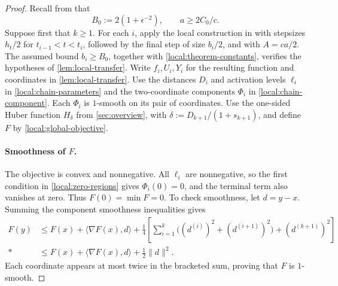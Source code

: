 \documentclass[11pt,letterpaper]{article}
\theoremstyle{definition}
\begin{document}
\begin{proof}
\label{local:chain-proof}
Recall from  that
\begin{equation}
  B_0:=2(1+\epsilon^{-2}),\qquad
  a\ge 2C_0/c.
  \label{local:theorem-constants}
\end{equation}
Suppose first that $k\ge1$.
For each $i$, apply the local construction in  with stepsizes $h_t/2$ for $t_{i-1}<t<t_i$, followed by the final step of size $b_i/2$, and with $A=ca/2$.
The assumed bound $b_i\ge B_0$, together with \eqref{local:theorem-constants}, verifies the hypotheses of \cref{lem:local-transfer}.
Write $f_i,U_i,Y_i$ for the resulting function and coordinates in \cref{lem:local-transfer}.
Use the distances $D_i$ and activation levels $\ell_i$ in \eqref{local:chain-parameters} and the two-coordinate components $\Phi_i$ in \eqref{local:chain-component}.
Each $\Phi_i$ is $1$-smooth on its pair of coordinates.
Use the one-sided Huber function $H_\delta$ from \cref{sec:overview}, with $\delta:=D_{k+1}/(1+s_{k+1})$, and define $F$ by \eqref{local:global-objective}.

\paragraph{Smoothness of $F$.}
The objective is convex and nonnegative.
All $\ell_i$ are nonnegative, so the first condition in \eqref{local:zero-regions} gives $\Phi_i(0)=0$, and the terminal term also vanishes at zero.
Thus $F(0)=\min F=0$.
To check smoothness, let $d=y-x$.
Summing the component smoothness inequalities gives
\begin{align*}
  F(y)&\le F(x)+\langle\nabla F(x),d\rangle
    +\frac14\left[
      \sum_{i=1}^k\bigl((d^{(i)})^2+(d^{(i+1)})^2\bigr)
      +(d^{(k+1)})^2\right]\\*
  &\le F(x)+\langle\nabla F(x),d\rangle+\frac12\|d\|^2.
\end{align*}
Each coordinate appears at most twice in the bracketed sum, proving that $F$ is $1$-smooth.


\end{proof}
\end{document}
